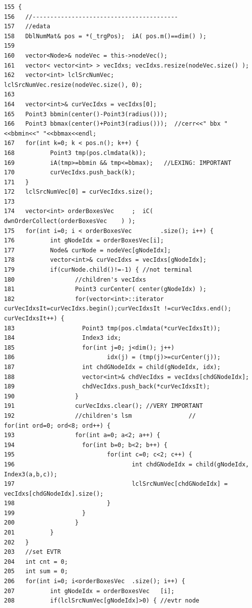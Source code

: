 \footnotesize\begin{verbatim}155 {
156   //-----------------------------------------
157   //edata
158   DblNumMat& pos = *(_trgPos);  iA( pos.m()==dim() );
159   
160   vector<Node>& nodeVec = this->nodeVec();
161   vector< vector<int> > vecIdxs; vecIdxs.resize(nodeVec.size() );
162   vector<int> lclSrcNumVec;           lclSrcNumVec.resize(nodeVec.size(), 0);
163   
164   vector<int>& curVecIdxs = vecIdxs[0];
165   Point3 bbmin(center()-Point3(radius()));
166   Point3 bbmax(center()+Point3(radius()));  //cerr<<" bbx "<<bbmin<<" "<<bbmax<<endl;
167   for(int k=0; k < pos.n(); k++) {
168          Point3 tmp(pos.clmdata(k));
169          iA(tmp>=bbmin && tmp<=bbmax);   //LEXING: IMPORTANT
170          curVecIdxs.push_back(k);
171   }
172   lclSrcNumVec[0] = curVecIdxs.size();
173   
174   vector<int> orderBoxesVec     ;  iC( dwnOrderCollect(orderBoxesVec    ) );
175   for(int i=0; i < orderBoxesVec        .size(); i++) {
176          int gNodeIdx = orderBoxesVec[i];
177          Node& curNode = nodeVec[gNodeIdx];
178          vector<int>& curVecIdxs = vecIdxs[gNodeIdx];    
179          if(curNode.child()!=-1) { //not terminal
180                 //children's vecIdxs
181                 Point3 curCenter( center(gNodeIdx) );
182                 for(vector<int>::iterator curVecIdxsIt=curVecIdxs.begin();curVecIdxsIt !=curVecIdxs.end(); curVecIdxsIt++) {
183                   Point3 tmp(pos.clmdata(*curVecIdxsIt));
184                   Index3 idx;
185                   for(int j=0; j<dim(); j++)
186                          idx(j) = (tmp(j)>=curCenter(j));
187                   int chdGNodeIdx = child(gNodeIdx, idx);
188                   vector<int>& chdVecIdxs = vecIdxs[chdGNodeIdx];
189                   chdVecIdxs.push_back(*curVecIdxsIt);
190                 }
191                 curVecIdxs.clear(); //VERY IMPORTANT
192                 //children's lsm                //              for(int ord=0; ord<8; ord++) {
193                 for(int a=0; a<2; a++) {
194                   for(int b=0; b<2; b++) {
195                          for(int c=0; c<2; c++) {
196                                 int chdGNodeIdx = child(gNodeIdx, Index3(a,b,c));
197                                 lclSrcNumVec[chdGNodeIdx] = vecIdxs[chdGNodeIdx].size();
198                          }
199                   }
200                 }
201          }
202   }
203   //set EVTR
204   int cnt = 0;
205   int sum = 0;
206   for(int i=0; i<orderBoxesVec  .size(); i++) {
207          int gNodeIdx = orderBoxesVec   [i];
208          if(lclSrcNumVec[gNodeIdx]>0) { //evtr node

\end{verbatim}
